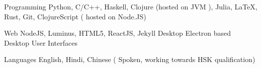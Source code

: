 

\begin{cvskills}

  \cvskill
    {Programming} %
    {Python, C/C++, Haskell, Clojure (hosted on JVM ), \newline   Julia, LaTeX, Rust, Git, ClojureScript ( hosted on Node.JS)
     } %

  \cvskill
    {Web} %
    { NodeJS, Luminus, HTML5, ReactJS, Jekyll} %
  \cvskill
    {Desktop} %
    {Electron based Desktop User Interfaces} %

  \cvskill
    {Languages} %
    {English, Hindi, Chinese ( Spoken, working towards HSK qualification)} %

\end{cvskills}

